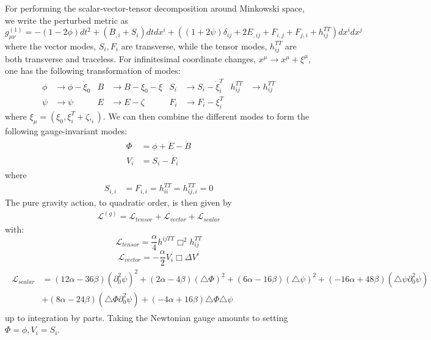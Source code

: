 \documentclass[aps,preprintnumbers,superscriptaddress,longbibliography]{revtex4-1}
\newcommand{\MS}[1]{{\color{blue}#1}}
\begin{document}
For performing the scalar-vector-tensor decomposition around Minkowski space, we write the perturbed metric as
\begin{equation}
   g_{\mu\nu}^{(1)}= -(1-2\phi)dt^2 + (B_{,i}+S_i)dtdx^{i}+((1+2\psi)\delta_{ij}+2E_{,ij}+F_{i,j}+F_{j,i}+h_{ij}^{TT})dx^{i}dx^{j}
\end{equation}
where the vector modes, $S_i,F_{i}$ are transverse, while the tensor modes, $h_{ij}^{TT}$ are both transverse and traceless.
For infinitesimal coordinate changes, $x^{\mu}\rightarrow x^{\mu}+\xi^{\mu}$, one has the following transformation of modes:
\begin{align}
\phi&\rightarrow \phi-\dot\xi_0   & B&\rightarrow  B-\xi_0-\dot \xi 
      &   S_i&\rightarrow S_i-\dot{\xi}_i^{T} &h^{TT}_{ij}&\rightarrow h^{TT}_{ij}\\ \psi&\rightarrow\psi  &  E&\rightarrow  E-\zeta & F_{i}&\rightarrow F_{i}-\xi_i^{T}
\end{align}
where $\xi_\mu=(\xi_0,\xi_i^{T}+\zeta,_i)$. We can then combine the different modes to form the following gauge-invariant modes:
\begin{align}
\begin{split}
    \Phi&=\phi+\ddot{E}-\dot{B} \\V_{i}&=S_{i}-\dot{F_i}
    \end{split}
\end{align}
where 
\begin{align}
S_{i,i}&=F_{i,i}=h^{TT}_{ii}=h^{TT}_{ij,i}=0
\end{align}
The pure gravity action, to quadratic order, is then given by
\begin{align}
\mathcal{L}^{(g)}=\mathcal{L}_{tensor}+\mathcal{L}_{vector} +\mathcal{L}_{scalar}
\end{align}
with:
\begin{equation}
    \label{eq:tensor}
\mathcal{L}_{tensor}=\frac{\alpha}{4} h^{ij{TT}}\Box^2h_{ij}^{TT}
\end{equation}
\begin{equation}
\label{eq:vector}
    \mathcal{L}_{vector}=-\frac{\alpha}{2}V_i\Box \Delta V^{i}
\end{equation}
\begin{align}
\begin{split}
\label{eq:scalar}
    \mathcal{L}_{scalar}&=(12\alpha-36\beta)(\partial^2_0\psi)^2+(2\alpha-4\beta)(\triangle\Phi)^2+(6\alpha-16\beta)(\triangle\psi)^2+ (-16\alpha+48\beta)(\triangle\psi\partial_0^2\psi)\\&+(8\alpha-24\beta)(\triangle\Phi\partial_0^2\psi)+(-4\alpha+16\beta)\triangle\Phi\triangle\psi
\end{split}
\end{align}
up to integration by parts.%
Taking the Newtonian gauge amounts to setting $\Phi=\phi, V_i=S_i$.
\end{document}
